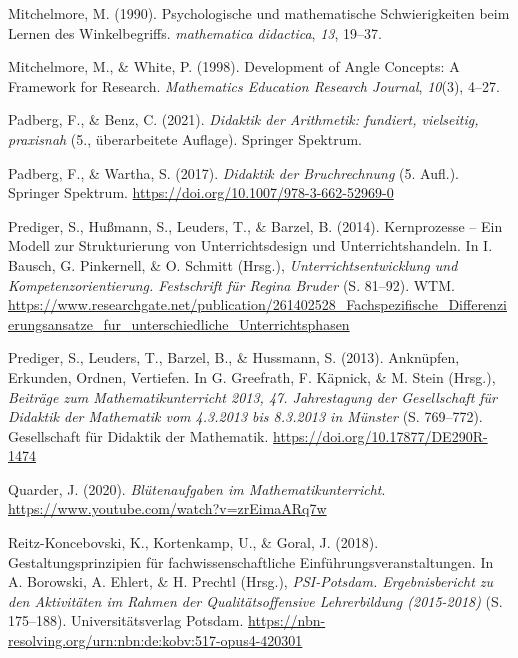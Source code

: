 \documentclass[
]{scrbook}
\newlength{\cslhangindent}
\newlength{\cslentryspacingunit} %
\newenvironment{CSLReferences}[2] %
 {%
  \setlength{\parindent}{0pt}
  \ifodd #1
  \let\oldpar\par
  \def\par{\hangindent=\cslhangindent\oldpar}
  \fi
  \setlength{\parskip}{#2\cslentryspacingunit}
 }%
 {}
\theoremstyle{definition}
\theoremstyle{definition}
\theoremstyle{definition}
\theoremstyle{definition}
\theoremstyle{remark}
\begin{document}
\begin{CSLReferences}{1}{0}
\leavevmode{}%
Mitchelmore, M. (1990). Psychologische und mathematische Schwierigkeiten beim Lernen des Winkelbegriffs. \emph{mathematica didactica}, \emph{13}, 19--37.

\leavevmode{}%
Mitchelmore, M., \& White, P. (1998). Development of {Angle} {Concepts}: {A} {Framework} for {Research}. \emph{Mathematics Education Research Journal}, \emph{10}(3), 4--27.

\leavevmode{}%
Padberg, F., \& Benz, C. (2021). \emph{Didaktik der {Arithmetik}: fundiert, vielseitig, praxisnah} (5., überarbeitete Auflage). Springer Spektrum.

\leavevmode{}%
Padberg, F., \& Wartha, S. (2017). \emph{Didaktik der {Bruchrechnung}} (5. Aufl.). Springer Spektrum. \url{https://doi.org/10.1007/978-3-662-52969-0}

\leavevmode{}%
Prediger, S., Hußmann, S., Leuders, T., \& Barzel, B. (2014). Kernprozesse -- {Ein} {Modell} zur {Strukturierung} von {Unterrichtsdesign} und {Unterrichtshandeln}. In I. Bausch, G. Pinkernell, \& O. Schmitt (Hrsg.), \emph{Unterrichtsentwicklung und {Kompetenzorientierung}. {Festschrift} für {Regina} {Bruder}} (S. 81--92). WTM. \url{https://www.researchgate.net/publication/261402528_Fachspezifische_Differenzierungsansatze_fur_unterschiedliche_Unterrichtsphasen}

\leavevmode{}%
Prediger, S., Leuders, T., Barzel, B., \& Hussmann, S. (2013). Anknüpfen, {Erkunden}, {Ordnen}, {Vertiefen}. In G. Greefrath, F. Käpnick, \& M. Stein (Hrsg.), \emph{Beiträge zum {Mathematikunterricht} 2013, 47. {Jahrestagung} der {Gesellschaft} für {Didaktik} der {Mathematik} vom 4.3.2013 bis 8.3.2013 in {Münster}} (S. 769--772). Gesellschaft für Didaktik der Mathematik. \url{https://doi.org/10.17877/DE290R-1474}

\leavevmode{}%
Quarder, J. (2020). \emph{Blütenaufgaben im {Mathematikunterricht}}. \url{https://www.youtube.com/watch?v=zrEimaARq7w}

\leavevmode{}%
Reitz-Koncebovski, K., Kortenkamp, U., \& Goral, J. (2018). Gestaltungsprinzipien für fachwissenschaftliche {Einführungsveranstaltungen}. In A. Borowski, A. Ehlert, \& H. Prechtl (Hrsg.), \emph{{PSI}-{Potsdam}. {Ergebnisbericht} zu den {Aktivitäten} im {Rahmen} der {Qualitätsoffensive} {Lehrerbildung} (2015-2018)} (S. 175--188). Universitätsverlag Potsdam. \url{https://nbn-resolving.org/urn:nbn:de:kobv:517-opus4-420301}


\end{CSLReferences}
\end{document}
